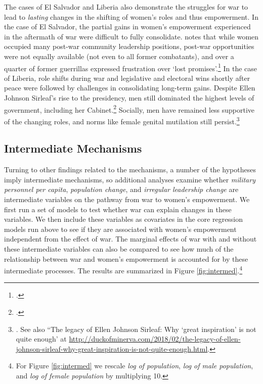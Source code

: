 \documentclass [12pt] {article}
\begin{document}
The cases of El Salvador and Liberia also demonstrate the struggles for war to lead to \emph{lasting} changes in the shifting of women's roles and thus empowerment. In the case of El Salvador, the partial gains in women's empowerment experienced in the aftermath of war were difficult to fully consolidate. \citeauthor{viterna2013women} notes that while women occupied many post-war community leadership positions, post-war opportunities were not equally available (not even to all former combatants), and over a quarter of former guerrillas expressed frustration over `lost promises'.\footnote{\citealt[192]{viterna2013women}.} In the case of Liberia, role shifts during war and legislative and electoral wins shortly after peace were followed by challenges in consolidating long-term gains. Despite Ellen Johnson Sirleaf's rise to the presidency, men still dominated the highest levels of government, including her Cabinet.\footnote{.}  Socially, men have remained less supportive of the changing roles, and norms like female genital mutilation still persist.\footnote{\citealt{tripp2015women}. See also ``The legacy of Ellen Johnson Sirleaf: Why `great inspiration' is not quite enough' at  \href{http://duckofminerva.com/2018/02/the-legacy-of-ellen-johnson-sirleaf-why-great-inspiration-is-not-quite-enough.html}{http://duckofminerva.com/2018/02/the-legacy-of-ellen-johnson-sirleaf-why-great-inspiration-is-not-quite-enough.html}.}  \\



\subsection*{Intermediate Mechanisms}
\vspace*{.2in}

Turning to other findings related to the mechanisms, a number of the hypotheses imply intermediate mechanisms, so additional analyses examine whether {\it military personnel per capita}, {\it population change},  and {\it irregular leadership change} are intermediate variables on the pathway from war to women's empowerment.  We first run a set of models to test whether war can explain changes in these variables.  We then include these variables as covariates in the core regression models run above to see if they are associated with women's empowerment independent from the effect of war. The marginal effects of war with and without these intermediate variables can also be compared to see how much of the relationship between war and women's empowerment is accounted for by these intermediate processes. The results are summarized in Figure \ref{fig:intermed}.\footnote{For Figure \ref{fig:intermed} we rescale {\it log of population}, {\it log of male population}, and {\it log of female population} by multiplying 10.} \\
\end{document}
